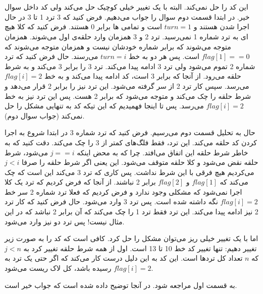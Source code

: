 \\
\\\noindent
این کد
را حل نمی‌کند.
البته با یک تغییر خیلی کوچیک حل می‌کند ولی کد داخل سوال خیر. در ابتدا قسمت دوم سوال را جواب
می‌دهیم. فرض کنید که 3 ترد 1 تا 3 در حال اجرا شدن هستند و
$turn = 1$
است و تمامی
ها
برابر 0 هستند.
فرض کنید که کلا هیچ
ای
به ترد شماره 1 نمی‌رسید.
ترد 2 و 3 همزمان وارد حلقه‌ی اول
می‌شوند. همزمان متوجه می‌شوند که
برابر شماره خودشان نیست و همزمان متوجه می‌شوند که
$flag[1] == 0$
است. پس هر دو به خط
$turn = i$
می‌رسند. حال فرض کنید که
ترد شماره 2 تموم می‌شود ولی ترد 3 ادامه پیدا می‌کند. ترد 3
را برابر 3 می‌کند و به شرط حلقه می‌رود. از آنجا که
برابر 3 است، کد ادامه پیدا می‌کند و به خط
$flag[i] = 2$
می‌رسد. سپس کار ترد 2 از سر گرفته می‌شود. این ترد نیز
را برابر 2 قرار می‌دهد و شرط حلقه را چک می‌کند و متوجه می‌شود که برابر 2 هست. پس این ترد نیز به خط
$flag[i] = 2$
می‌رسد. پس تا اینجا فهمیدیم که این تیکه کد به تنهایی مشکل
را حل نمی‌کند (جواب سوال دوم).

\noindent
حال به تحلیل قسمت دوم می‌رسیم.
فرض کنید که ترد شماره 3 در ابتدا شروع به اجرا کردن کد حلقه می‌کند. این ترد، فقط فلگ‌های کمتر از 3
را چک می‌کند. دقت کنید که به خاطر شرط حلقه این اتفاق می‌افتد. چرا که به محض اینکه
$j == i$
می‌شود، شرط حلقه نقض می‌شود و کلا حلقه متوقف می‌شود. این یعنی اگر شرط حلقه‌ را صرفا
$j < i$
می‌کردیم هیچ فرقی با این شرط نداشت. پس کاری که ترد 3 می‌کند این است که چک می‌کند که
$flag[1]$
و
$flag[2]$
برابر 2 نباشند. از آنجا که فرض کردیم که ترد یک کلا اجرا نمی‌شود که مشکلی وجود ندارد و فرض کردیم که فعلا
ترد شماره 2 سر خط
$flag[i] = 2$
نگه داشته شده است. پس ترد 3 وارد
می‌شود. حال فرض کنید که کار ترد 2 نیز ادامه پیدا می‌کند. این ترد فقط ترد 1 را چک می‌کند که
آن برابر 2 نباشد که در این مثال نیست! پس ترد دو نیز وارد
می‌شود.

\noindent
اما با یک تغییر خیلی ریز می‌توان مشکل را حل کرد. کافی است که کد را به صورت زیر تغییر دهیم:
\noindent
تنها تغییر کد خط 10 تا 13 است. اول از همه شرط حلقه تغییر کرد به
$j < n$
که
$n$
تعداد کل ترد‌ها است. این کد به این دلیل درست کار می‌کند که اگر حتی یک ترد به
$flag[i] = 2$
رسیده باشد، کل لاک ریست می‌شود.

به قسمت اول مراجعه شود. در آنجا توضیح داده شده است که جواب خیر است.

